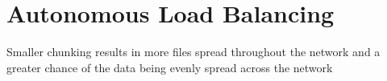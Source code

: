\chapter{Autonomous Load Balancing}
\label{chapter:auto-balance}

Smaller chunking results in more files spread throughout the  network and a greater chance of the data being evenly spread across the network